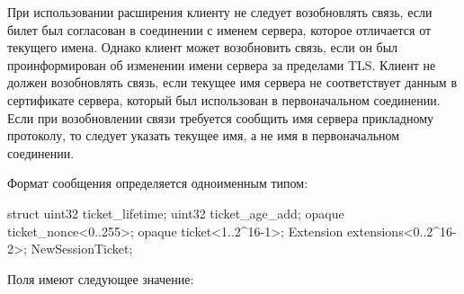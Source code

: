 При использовании расширения  клиенту
не следует возобновлять связь, если билет был согласован в соединении с именем 
сервера, которое отличается от текущего имена. 
%
%
Однако клиент может возобновить связь, если он был проинформирован об изменении 
имени сервера за пределами TLS.
%
Клиент не должен возобновлять связь, если текущее имя сервера не соответствует 
данным в сертификате сервера, который был использован в первоначальном соединении.
%
Если при возобновлении связи требуется сообщить имя сервера прикладному 
протоколу, то следует указать текущее имя, а не имя в первоначальном соединении.
%

Формат сообщения  определяется одноименным типом:
%
\begin{codeblock}
struct {
  uint32 ticket_lifetime;
  uint32 ticket_age_add;
  opaque ticket_nonce<0..255>;
  opaque ticket<1..2^16-1>;
  Extension extensions<0..2^16-2>;
} NewSessionTicket;
\end{codeblock}

Поля  имеют следующее значение:

